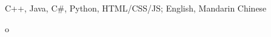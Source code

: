 

\begin{cvparagraph}

C++, Java, C#, Python, HTML/CSS/JS; English, Mandarin Chinese
\end{cvparagraph}
o